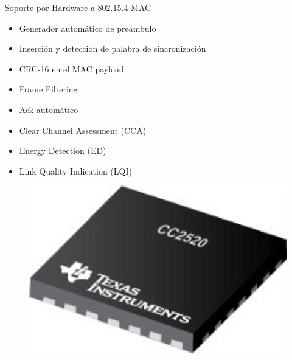 \documentclass[aspectratio=169]{beamer}
\begin{document}
\begin{frame}{Soporte por Hardware a 802.15.4 MAC} 
\begin{minipage}[c]{1.0\linewidth}
	\begin{minipage}[c]{0.70\linewidth}
		\begin{itemize}
			\vspace{5px}
			\item Generador automático de preámbulo	
			\vspace{5px}
			\item Inserción y detección de palabra de sincronización	
			\vspace{5px}
			\item CRC-16 en el MAC payload
			\vspace{5px}
			\item Frame Filtering
			\vspace{5px}
			\item Ack automático
			\vspace{5px}
			\item Clear Channel Assessment (CCA)
			\vspace{5px}
			\item Energy Detection (ED)
			\vspace{5px}
			\item Link Quality Indication (LQI)
		\end{itemize}
	\end{minipage}
	\begin{minipage}[c]{0.25\linewidth}
		\begin{figure}[H]
			\includegraphics[width=1\textwidth]{./imagenes/cc2520.jpg}
		\end{figure}	  	  	
	\end{minipage}
\end{minipage}
\end{frame}
\end{document}
